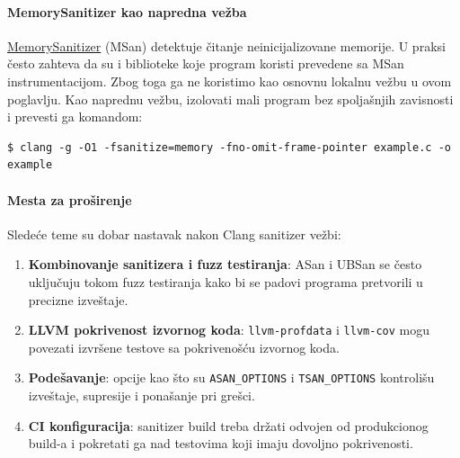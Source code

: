 \paragraph{MemorySanitizer kao napredna vežba}\label{memorysanitizer-napredno}

\href{https://clang.llvm.org/docs/MemorySanitizer.html}{MemorySanitizer} (MSan) detektuje čitanje neinicijalizovane memorije. U praksi često zahteva da su i biblioteke koje program koristi prevedene sa MSan instrumentacijom. Zbog toga ga ne koristimo kao osnovnu lokalnu vežbu u ovom poglavlju. Kao naprednu vežbu, izolovati mali program bez spoljašnjih zavisnosti i prevesti ga komandom:

\begin{verbatim}
$ clang -g -O1 -fsanitize=memory -fno-omit-frame-pointer example.c -o example
\end{verbatim}

\paragraph{Mesta za proširenje}\label{clang-prosirenja-backlog}

Sledeće teme su dobar nastavak nakon Clang sanitizer vežbi:

\begin{enumerate}
\tightlist
\item
  \textbf{Kombinovanje sanitizera i fuzz testiranja}: ASan i UBSan se često uključuju tokom fuzz testiranja kako bi se padovi programa pretvorili u precizne izveštaje.
\item
  \textbf{LLVM pokrivenost izvornog koda}: \texttt{llvm-profdata} i \texttt{llvm-cov} mogu povezati izvršene testove sa pokrivenošću izvornog koda.
\item
  \textbf{Podešavanje}: opcije kao što su \texttt{ASAN\_OPTIONS} i \texttt{TSAN\_OPTIONS} kontrolišu izveštaje, supresije i ponašanje pri grešci.
\item
  \textbf{CI konfiguracija}: sanitizer build treba držati odvojen od produkcionog build-a i pokretati ga nad testovima koji imaju dovoljno pokrivenosti.
\end{enumerate}
